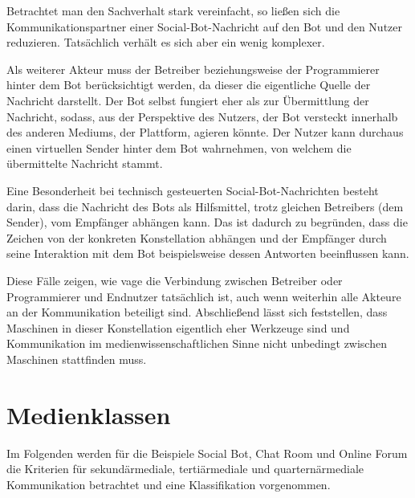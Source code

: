 Betrachtet man den Sachverhalt stark vereinfacht, so ließen sich die Kommunikationspartner einer Social-Bot-Nachricht auf den Bot und den Nutzer reduzieren. Tatsächlich verhält es sich aber ein wenig komplexer.

Als weiterer Akteur muss der Betreiber beziehungsweise der Programmierer hinter dem Bot berücksichtigt werden, da dieser die eigentliche Quelle der Nachricht darstellt. Der Bot selbst fungiert eher als  zur Übermittlung der Nachricht, sodass, aus der Perspektive des Nutzers, der Bot versteckt innerhalb des anderen Mediums, der Plattform, agieren könnte. Der Nutzer kann durchaus einen virtuellen Sender hinter dem Bot wahrnehmen, von welchem die übermittelte Nachricht stammt. \cite[S. 68]{001_MKO02_media-as-means-of-communication}

Eine Besonderheit bei technisch gesteuerten Social-Bot-Nachrichten besteht darin, dass die Nachricht des Bots als Hilfsmittel, trotz gleichen Betreibers (dem Sender), vom Empfänger abhängen kann. Das ist dadurch zu begründen, dass die Zeichen von der konkreten Konstellation abhängen und der Empfänger durch seine Interaktion mit dem Bot beispielsweise dessen Antworten beeinflussen kann. \cite[S. 68]{001_MKO02_media-as-means-of-communication}

Diese Fälle zeigen, wie vage die Verbindung zwischen Betreiber oder Programmierer und Endnutzer tatsächlich ist, auch wenn weiterhin alle Akteure an der Kommunikation beteiligt sind. Abschließend lässt sich feststellen, dass Maschinen in dieser Konstellation eigentlich eher Werkzeuge sind und Kommunikation im medienwissenschaftlichen Sinne nicht unbedingt zwischen Maschinen stattfinden muss.

\section{Medienklassen}
\label{sec:01-02_media-classes}

Im Folgenden werden für die Beispiele Social Bot, Chat Room und Online Forum die Kriterien für sekundärmediale, tertiärmediale und quarternärmediale Kommunikation betrachtet und eine Klassifikation vorgenommen.

